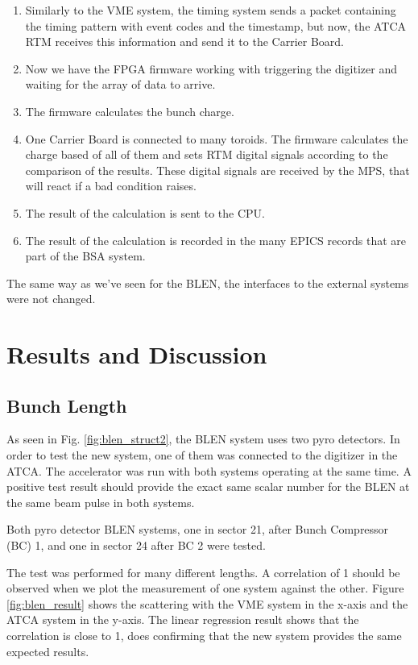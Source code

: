 \documentclass[letter,
               biblatex,     %
               keeplastbox,   %
               ]{jacow}
\begin{document}
\begin{enumerate}
   \item Similarly to the VME system, the timing system sends a packet containing the timing pattern with event codes and the timestamp, but now, the ATCA RTM receives this information and send it to the Carrier Board.
   \item Now we have the FPGA firmware working with triggering the digitizer and waiting for the array of data to arrive.
   \item The firmware calculates the bunch charge.
   \item One Carrier Board is connected to many toroids. The firmware calculates the charge based of all of them and sets RTM digital signals according to the comparison of the results. These digital signals are received by the MPS, that will react if a bad condition raises.
   \item The result of the calculation is sent to the CPU.
   \item The result of the calculation is recorded in the many EPICS records that are part of the BSA system.
\end{enumerate}

The same way as we've seen for the BLEN, the interfaces to the external systems were not changed.

\section{Results and Discussion}
\subsection{Bunch Length}
As seen in Fig. \ref{fig:blen_struct2}, the BLEN system uses two pyro detectors. In order to test the new system, one of them was connected to the digitizer in the ATCA. The accelerator was run with both systems operating at the same time. A positive test result should provide the exact same scalar number for the BLEN at the same beam pulse in both systems.

Both pyro detector BLEN systems, one in sector 21, after Bunch Compressor (BC) 1, and one in sector 24 after BC 2 were tested.

The test was performed for many different lengths. A correlation of 1 should be observed when we plot the measurement of one system against the other. Figure \ref{fig:blen_result} shows the scattering with the VME system in the x-axis and the ATCA system in the y-axis. The linear regression result shows that the correlation is close to 1, does confirming that the new system provides the same expected results.
\end{document}
